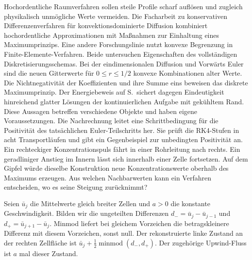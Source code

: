 Hochordentliche Raumverfahren sollen steile Profile scharf auflösen und zugleich physikalisch unmögliche Werte vermeiden. Die Facharbeit zu konservativen Differenzenverfahren für konvektionsdominierte Diffusion kombiniert hochordentliche Approximationen mit Maßnahmen zur Einhaltung eines Maximumprinzips. Eine andere Forschungslinie nutzt konvexe Begrenzung in Finite-Elemente-Verfahren. Beide untersuchen Eigenschaften des vollständigen Diskretisierungsschemas.
Bei der eindimensionalen Diffusion und Vorwärts Euler sind die neuen Gitterwerte für \(0\le r\le1/2\) konvexe Kombinationen alter Werte. Die Nichtnegativität der Koeffizienten und ihre Summe eins beweisen das diskrete Maximumprinzip. Der Energiebeweis auf S.\, sichert dagegen Eindeutigkeit hinreichend glatter Lösungen der kontinuierlichen Aufgabe mit gekühltem Rand. Diese Aussagen betreffen verschiedene Objekte und haben eigene Voraussetzungen.
Die Nachrechnung leitet eine Schrittbedingung für die Positivität des tatsächlichen Euler-Teilschritts her. Sie prüft die RK4-Stufen in acht Transportläufen und gibt ein Gegenbeispiel zur unbedingten Positivität an.
Ein rechteckiger Konzentrationspuls fährt in einer Rohrleitung nach rechts. Ein geradliniger Anstieg im Innern lässt sich innerhalb einer Zelle fortsetzen. Auf dem Gipfel würde dieselbe Konstruktion neue Konzentrationswerte oberhalb des Maximums erzeugen. Aus welchen Nachbarwerten kann ein Verfahren entscheiden, wo es seine Steigung zurücknimmt?

Seien \(\bar u_j\) die Mittelwerte gleich breiter Zellen und \(a>0\) die konstante Geschwindigkeit. Bilden wir die ungeteilten Differenzen \(d_-=\bar u_j-\bar u_{j-1}\) und \(d_+=\bar u_{j+1}-\bar u_j\). Minmod liefert bei gleichem Vorzeichen die betragskleinere Differenz mit diesem Vorzeichen, sonst null. Der rekonstruierte linke Zustand an der rechten Zellfläche ist \(\bar u_j+\tfrac12\operatorname{minmod}(d_-,d_+)\). Der zugehörige Upwind-Fluss ist \(a\) mal dieser Zustand.

